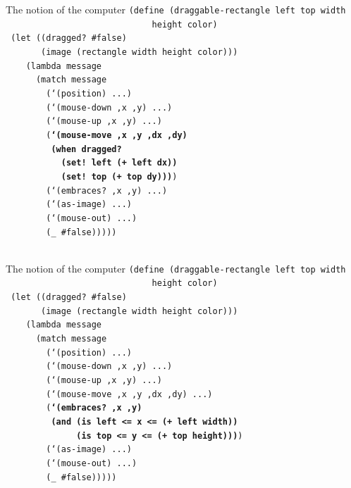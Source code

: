 \documentclass{beamer}
\begin{document}
\begin{frame}{The notion of the computer}
  \small
  \texttt{(define (draggable-rectangle left top width \\
    \ \ \ \ \ \ \ \ \ \ \ \ \ \ \ \ \ \ \ \ \ \ \ \ \ \ \ \ \ height color)\\
    \ (let ((dragged? \#false)\\
  \ \ \ \ \ \ \ (image (rectangle width height color)))\\
  \ \ \ \ (lambda message\\
  \ \ \ \ \ \ (match message\\
  \ \ \ \ \ \ \ \ (`(position) ...)\\
  \ \ \ \ \ \ \ \ (`(mouse-down ,x ,y) ...)\\
  \ \ \ \ \ \ \ \ (`(mouse-up ,x ,y) ...)\\
  \ \ \ \ \ \ \ \ (\textbf{`(mouse-move ,x ,y ,dx ,dy)\\
    \ \ \ \ \ \ \ \ \ (when dragged?\\
    \ \ \ \ \ \ \ \ \ \ \ (set! left (+ left dx)) \\  
    \ \ \ \ \ \ \ \ \ \ \ (set! top (+ top dy)))})\\
  \ \ \ \ \ \ \ \ (`(embraces? ,x ,y) ...)\\
  \ \ \ \ \ \ \ \ (`(as-image) ...)\\
  \ \ \ \ \ \ \ \ (`(mouse-out) ...)\\
  \ \ \ \ \ \ \ \ (\_ \#false)))))\\
  \ 
}
\end{frame}


\begin{frame}{The notion of the computer}
  \small
  \texttt{(define (draggable-rectangle left top width \\
    \ \ \ \ \ \ \ \ \ \ \ \ \ \ \ \ \ \ \ \ \ \ \ \ \ \ \ \ \ height color)\\
    \ (let ((dragged? \#false)\\
  \ \ \ \ \ \ \ (image (rectangle width height color)))\\
  \ \ \ \ (lambda message\\
  \ \ \ \ \ \ (match message\\
  \ \ \ \ \ \ \ \ (`(position) ...)\\
  \ \ \ \ \ \ \ \ (`(mouse-down ,x ,y) ...)\\
  \ \ \ \ \ \ \ \ (`(mouse-up ,x ,y) ...)\\
  \ \ \ \ \ \ \ \ (`(mouse-move ,x ,y ,dx ,dy) ...)\\
  \ \ \ \ \ \ \ \ (\textbf{`(embraces? ,x ,y) \\
    \ \ \ \ \ \ \ \ \ (and (is left <= x <= (+ left width))\\
    \ \ \ \ \ \ \ \ \ \ \ \ \ \ (is top <= y <= (+ top height)))})\\
  \ \ \ \ \ \ \ \ (`(as-image) ...)\\
  \ \ \ \ \ \ \ \ (`(mouse-out) ...)\\
  \ \ \ \ \ \ \ \ (\_ \#false)))))\\
  \ \\
  \ 
}
\end{frame}
\end{document}

